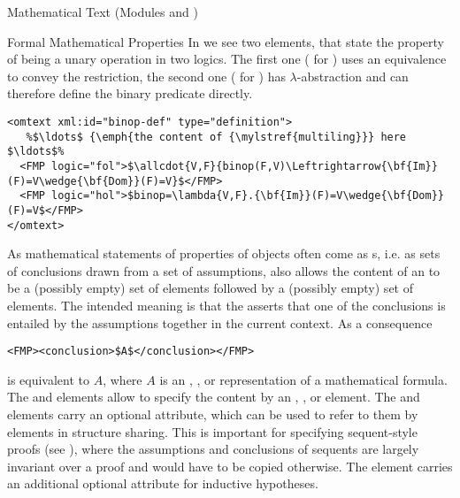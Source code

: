 \begin{tchapter}[id=mtxt,short=Mathematical Text]{Mathematical Text (Modules
  {} and {})}
\begin{tsection}[id=FMP]{Formal Mathematical Properties}
  In {} we see two {} elements, that state the property
  of being a unary operation in two logics. The first one ({} for
  {}) uses an equivalence to convey the restriction, the
  second one ({} for {}) has
  $\lambda$-abstraction and can therefore define the binary predicate {}
  directly.

\begin{lstlisting}[escapechar=\%,label=lst:omtext-def,mathescape,
  caption={A multi-logic {\element{FMP}} group for {\mylstref{multiling}}.},
  index={trl,xml:lang,CMP,FMP,OMOBJ}]
<omtext xml:id="binop-def" type="definition">
   %$\ldots$ {\emph{the content of {\mylstref{multiling}}} here $\ldots$%
  <FMP logic="fol">$\allcdot{V,F}{binop(F,V)\Leftrightarrow{\bf{Im}}(F)=V\wedge{\bf{Dom}}(F)=V}$</FMP>
  <FMP logic="hol">$binop=\lambda{V,F}.{\bf{Im}}(F)=V\wedge{\bf{Dom}}(F)=V$</FMP>
</omtext>
\end{lstlisting}

As mathematical statements of properties of objects often come as {s},
i.e. as sets of conclusions drawn from a set of assumptions, {\omdoc} also allows the
content of an {} to be a (possibly empty) set of {}
elements followed by a (possibly empty) set of {} elements. The intended
meaning is that the {} asserts that one of the conclusions is entailed by the
assumptions together in the current context.  As a consequence
\begin{lstlisting}[mathescape]
<FMP><conclusion>$A$</conclusion></FMP>
\end{lstlisting}
  is equivalent to {$A$}, where $A$ is an {\openmath},
  {\cmathml}, or {} representation of a mathematical formula. The
  {} and {} elements allow to specify the content
  by an {}, {}, or {}
  element. The {} and
  {} elements carry an optional {}
  attribute, which can be used to refer to them by {} elements in structure
  sharing. This is important for specifying sequent-style proofs (see
  {}), where the assumptions and conclusions of sequents are largely
  invariant over a proof and would have to be copied otherwise. The {}
  element carries an additional optional attribute {} for
  inductive hypotheses.


\end{tsection}
\end{tchapter}
